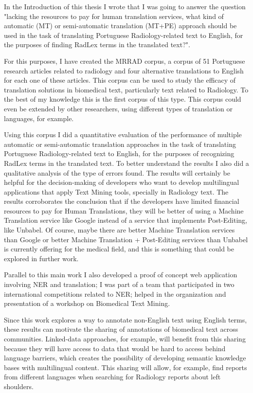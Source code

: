 \label{chap5}

In the Introduction of this thesis I wrote that I was going to answer the question "lacking the resources to pay for human translation services, what kind of automatic (MT) or semi-automatic translation (MT+PE) approach should be used in the task of translating Portuguese Radiology-related text to English, for the purposes of finding RadLex terms in the translated text?". 

For this purposes, I have created the MRRAD corpus, a corpus of 51 Portuguese research articles related to radiology and four alternative translations to English for each one of these articles. This corpus can be used to study the efficacy of translation solutions in biomedical text, particularly text related to Radiology. To the best of my knowledge this is the first corpus of this type. This corpus could even be extended by other researchers, using different types of translation or languages, for example. 

Using this corpus I did a quantitative evaluation of the performance of multiple automatic or semi-automatic translation approaches in the task of translating Portuguese Radiology-related text to English, for the purposes of recognizing RadLex terms in the translated text. To better understand the results I also did a qualitative analysis of the type of errors found. The results will certainly be helpful for the decision-making of developers who want to develop multilingual applications that apply Text Mining tools, specially in Radiology text. The results corroborates the conclusion that if the developers have limited financial resources to pay for Human Translations, they will be better of using a Machine Translation service like Google instead of a service that implements Post-Editing, like Unbabel. Of course, maybe there are better Machine Translation services than Google or better Machine Translation + Post-Editing services than Unbabel is currently offering for the medical field, and this is something that could be explored in further work. 

Parallel to this main work I also developed a proof of concept web application involving NER and translation; I was part of a team that participated in two international competitions related to NER; helped in the organization and presentation of a workshop on Biomedical Text Mining.

Since this work explores a way to annotate non-English text using English terms, these results can motivate the sharing of annotations of biomedical text across communities. Linked-data \citep{Barros2016} approaches, for example, will benefit from this sharing because they will have access to data that would be hard to access behind language barriers, which creates the possibility of developing semantic knowledge bases \citep{Monteiro2016} with multilingual content. This sharing will allow, for example, find reports from different languages when searching for Radiology reports about left shoulders.

